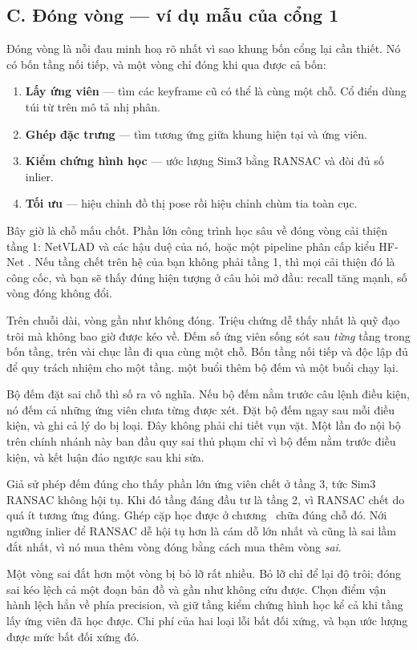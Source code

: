 \documentclass[../../deep_learning.tex]{subfiles}
\begin{document}
\subsection{C. Đóng vòng --- ví dụ mẫu của cổng 1}
Đóng vòng là nỗi đau minh hoạ rõ nhất vì sao khung bốn cổng lại cần thiết. Nó có bốn tầng nối tiếp, và một vòng chỉ đóng khi qua được cả bốn:

\begin{enumerate}
\item \textbf{Lấy ứng viên} --- tìm các keyframe cũ có thể là cùng một chỗ. Cổ điển dùng túi từ trên mô tả nhị phân.
\item \textbf{Ghép đặc trưng} --- tìm tương ứng giữa khung hiện tại và ứng viên.
\item \textbf{Kiểm chứng hình học} --- ước lượng Sim3 bằng RANSAC và đòi đủ số inlier.
\item \textbf{Tối ưu} --- hiệu chỉnh đồ thị pose rồi hiệu chỉnh chùm tia toàn cục.
\end{enumerate}

Bây giờ là chỗ mấu chốt. Phần lớn công trình học sâu về đóng vòng cải thiện tầng 1: NetVLAD \cite{arandjelovic2016netvlad} và các hậu duệ của nó, hoặc một pipeline phân cấp kiểu HF-Net \cite{sarlin2019hfnet}. Nếu tầng chết trên hệ của bạn không phải tầng 1, thì mọi cải thiện đó là công cốc, và bạn sẽ thấy đúng hiện tượng ở câu hỏi mở đầu: recall tăng mạnh, số vòng đóng không đổi.

\begin{mach}
\item \vd Trên chuỗi dài, vòng gần như không đóng. Triệu chứng dễ thấy nhất là quỹ đạo trôi mà không bao giờ được kéo về.
  \gp Đếm số ứng viên sống sót sau \emph{từng} tầng trong bốn tầng, trên vài chục lần đi qua cùng một chỗ.
  \gd Bốn tầng nối tiếp và độc lập đủ để quy trách nhiệm cho một tầng.
  \gia một buổi thêm bộ đếm và một buổi chạy lại.
\item \vd Bộ đếm đặt sai chỗ thì số ra vô nghĩa. Nếu bộ đếm nằm trước câu lệnh điều kiện, nó đếm cả những ứng viên chưa từng được xét.
  \gp Đặt bộ đếm ngay sau mỗi điều kiện, và ghi cả lý do bị loại.
  \hq Đây không phải chi tiết vụn vặt. Một lần đo nội bộ trên chính nhánh này ban đầu quy sai thủ phạm chỉ vì bộ đếm nằm trước điều kiện, và kết luận đảo ngược sau khi sửa.
\item \vd Giả sử phép đếm đúng cho thấy phần lớn ứng viên chết ở tầng 3, tức Sim3 RANSAC không hội tụ.
  \gp Khi đó tầng đáng đầu tư là tầng 2, vì RANSAC chết do quá ít tương ứng đúng. Ghép cặp học được ở chương~ chữa đúng chỗ đó.
  \vdm Nới ngưỡng inlier để RANSAC dễ hội tụ hơn là cám dỗ lớn nhất và cũng là sai lầm đắt nhất, vì nó mua thêm vòng đóng bằng cách mua thêm vòng \emph{sai}.
\item \vd Một vòng sai đắt hơn một vòng bị bỏ lỡ rất nhiều. Bỏ lỡ chỉ để lại độ trôi; đóng sai kéo lệch cả một đoạn bản đồ và gần như không cứu được.
  \gp Chọn điểm vận hành lệch hẳn về phía precision, và giữ tầng kiểm chứng hình học kể cả khi tầng lấy ứng viên đã học được.
  \gd Chi phí của hai loại lỗi bất đối xứng, và bạn ước lượng được mức bất đối xứng đó.
\end{mach}
\end{document}
